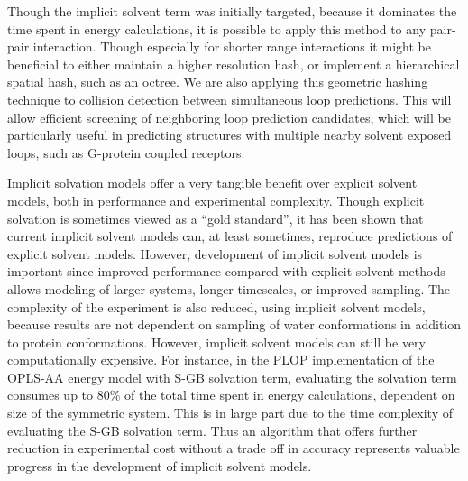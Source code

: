 Though the implicit solvent term was initially targeted, because it dominates the time spent in energy calculations, it is possible to apply this method to any pair-pair interaction.
Though especially for shorter range interactions it might be beneficial to either maintain a higher resolution hash, or implement a hierarchical spatial hash, such as an octree.
We are also applying this geometric hashing technique to collision detection between simultaneous loop predictions.
This will allow efficient screening of neighboring loop prediction candidates, which will be particularly useful in predicting structures with multiple nearby solvent exposed loops, such as G-protein coupled receptors.

Implicit solvation models offer a very tangible benefit over explicit solvent models, both in performance and experimental complexity.
Though explicit solvation is sometimes viewed as a ``gold standard'', it has been shown that current implicit solvent models can, at least sometimes, reproduce predictions of explicit solvent models.
However, development of implicit solvent models is important since improved performance compared with explicit solvent methods allows modeling of larger systems, longer timescales, or improved sampling.
The complexity of the experiment is also reduced, using implicit solvent models, because results are not dependent on sampling of water conformations in addition to protein conformations.
However, implicit solvent models can still be very computationally expensive.
For instance, in the PLOP implementation of the OPLS-AA energy model with S-GB solvation term, evaluating the solvation term consumes up to 80\% of the total time spent in energy calculations, dependent on size of the symmetric system.
This is in large part due to the time complexity of evaluating the S-GB solvation term.
Thus an algorithm that offers further reduction in experimental cost without a trade off in accuracy represents valuable progress in the development of implicit solvent models.



